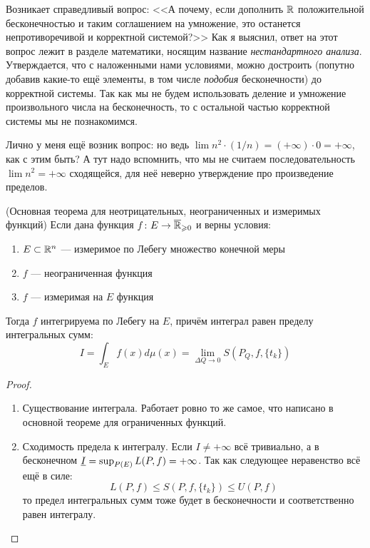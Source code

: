 \begin{anote}
	Возникает справедливый вопрос: <<А почему, если дополнить $\mathbb{R}$ положительной бесконечностью и таким соглашением на умножение, это останется непротиворечивой и корректной системой?>> Как я выяснил, ответ на этот вопрос лежит в разделе математики, носящим название \textit{нестандартного анализа}. Утверждается, что с наложенными нами условиями, можно достроить (попутно добавив какие-то ещё элементы, в том числе \textit{подобия} бесконечности) до корректной системы. Так как мы не будем использовать деление и умножение произвольного числа на бесконечность, то с остальной частью корректной системы мы не познакомимся.
	
	Лично у меня ещё возник вопрос: но ведь $\lim n^2 \cdot (1/n) = (+\infty) \cdot 0 = +\infty$, как с этим быть? А тут надо вспомнить, что мы не считаем последовательность $\lim n^2 = +\infty$ сходящейся, для неё неверно утверждение про произведение пределов.
\end{anote}

\begin{theorem} (Основная теорема для неотрицательных, неограниченных и измеримых функций)
	Если дана функция $f \colon E \to \overline{\mathbb{R}}_{\geqslant 0}$ и верны условия:
	\begin{enumerate}
		\item $E \subset \mathbb{R}^n$ --- измеримое по Лебегу множество конечной меры
		
		\item $f$ --- неограниченная функция
		
		\item $f$ --- измеримая на $E$ функция
	\end{enumerate}
	Тогда $f$ интегрируема по Лебегу на $E$, причём интеграл равен пределу интегральных сумм:
	\[
		I = \int_E f(x)d\mu(x) = \lim_{\Delta Q \to 0} S(P_Q, f, \{t_k\})
	\]
\end{theorem}

\begin{proof}~
	\begin{enumerate}
		\item Существование интеграла. Работает ровно то же самое, что написано в основной теореме для ограниченных функций.
		
		\item Сходимость предела к интегралу. Если $I \neq +\infty$ всё тривиально, а в бесконечном $\underline{I} = \sup_{P(E)} L(P, f) = +\infty$. Так как следующее неравенство всё ещё в силе:
		\[
			L(P, f) \le S(P, f, \{t_k\}) \le U(P, f)
		\]
		то предел интегральных сумм тоже будет в бесконечности и соответственно равен интегралу.
	\end{enumerate}
\end{proof}

